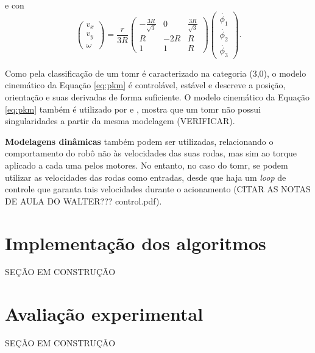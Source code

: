 e
con
\begin{equation}
  \begin{pmatrix}
    v_x \\
    v_y \\
    \omega
  \end{pmatrix}
  =
  \frac{r}{3R}
  \begin{pmatrix}
    -\frac{3R}{\sqrt{3}} & 0   & \frac{3R}{\sqrt{3}} \\
    R                    & -2R & R                   \\
    1                    & 1   & R
  \end{pmatrix}
  \begin{pmatrix}
    \dot{\phi_1} \\
    \dot{\phi_2} \\
    \dot{\phi_3}
  \end{pmatrix}.
  \label{eq:dk}
\end{equation}


Como pela classificação de \cite{campion1996structural} um \acrshort{tomr} é caracterizado na categoria (3,0), o modelo cinemático da Equação \ref{eq:pkm} é controlável, estável e descreve a posição, orientação e suas derivadas de forma suficiente. O modelo cinemático da Equação \ref{eq:pkm} também é utilizado por \cite{rojas2006holonomic} e \cite{ritter2016modelagem}, \cite{loh2003mechatronics} mostra que um \acrshort{tomr} não possui singularidades a partir da mesma modelagem (VERIFICAR).

\textbf{Modelagens dinâmicas} também podem ser utilizadas, relacionando o comportamento do robô não às velocidades das suas rodas, mas sim ao torque aplicado a cada uma pelos motores. No entanto, no caso do \acrshort{tomr}, se podem utilizar as velocidades das rodas como entradas, desde que haja um \emph{loop} de controle que garanta tais velocidades durante o acionamento (CITAR AS NOTAS DE AULA DO WALTER??? control.pdf).

\section{Implementação dos algoritmos}
\label{sec:software}

SEÇÃO EM CONSTRUÇÃO

\section{Avaliação experimental}
\label{sec:experimental}

SEÇÃO EM CONSTRUÇÃO
